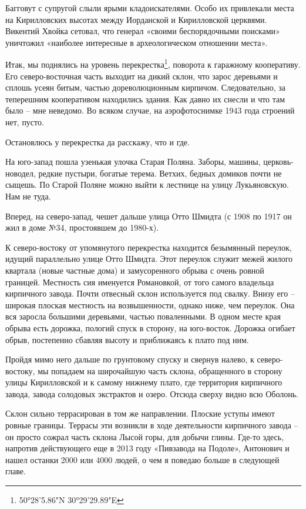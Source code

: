 Багговут с супругой слыли ярыми кладоискателями. Особо их привлекали места на Кирилловских высотах между Иорданской и Кирилловской церквями. Викентий Хвойка сетовал, что генерал «своими беспорядочными поисками» уничтожил «наиболее интересные в археологическом отношении места».

Итак, мы поднялись на уровень перекрестка\footnote{50°28'5.86"N 30°29'29.89"E}, поворота к гаражному кооперативу. Его северо-восточная часть выходит на дикий склон, что зарос деревьями и сплошь усеян битым, частью дореволюционным кирпичом. Следовательно, за теперешним кооперативом находились здания. Как давно их снесли и что там было – мне неведомо. Во всяком случае, на аэрофотоснимке 1943 года строений нет, пусто.

Остановлюсь у перекрестка да расскажу, что и где.

На юго-запад пошла узенькая улочка Старая Поляна. Заборы, машины, церковь-новодел, редкие пустыри, богатые терема. Ветхих, бедных домиков почти не сыщешь. По Старой Поляне можно выйти к лестнице на улицу Лукьяновскую. Нам не туда.

Вперед, на северо-запад, чешет дальше улица Отто Шмидта (с 1908 по 1917 он жил в доме №34, простоявшем до 1980-х).

К северо-востоку от упомянутого перекрестка находится безымянный переулок, идущий параллельно улице Отто Шмидта. Этот переулок служит межей жилого квартала (новые частные дома) и замусоренного обрыва с очень ровной границей. Местность сия именуется Романовкой, от того самого владельца кирпичного завода. Почти отвесный склон используется под свалку. Внизу его – широкая плоская местность на возвышенности, однако ниже, чем переулок. Она вся заросла большими деревьями, частью поваленными. В одном месте края обрыва есть дорожка, пологий спуск в сторону, на юго-восток. Дорожка огибает обрыв, постепенно сбавляя высоту и приближаясь к плато под ним.

Пройдя мимо него дальше по грунтовому спуску и свернув налево, к северо-востоку, мы попадаем на широчайшую часть склона, обращенного в сторону улицы Кирилловской и к самому нижнему плато, где территория кирпичного завода, завода солодовых экстрактов и озеро. Отсюда сверху видно всю Оболонь.

Склон сильно террасирован в том же направлении. Плоские уступы имеют ровные границы. Террасы эти возникли в ходе деятельности кирпичного завода – он просто сожрал часть склона Лысой горы, для добычи глины. Где-то здесь, напротив действующего еще в 2013 году «Пивзавода на Подоле», Антонович и нашел останки 2000 или 4000 людей, о чем я поведаю больше в следующей главе.

